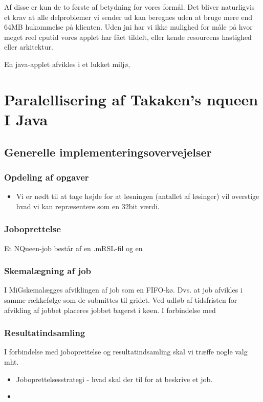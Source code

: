 \documentclass[final,a4paper,10pt]{article}
\newcommand{\mig}{MiG}
\begin{document}
Af disse er kun de to første af betydning for vores formål. Det bliver naturligvis et krav at alle delproblemer vi sender ud kan beregnes uden at bruge mere end 64MB hukommelse på klienten. Uden jni har vi ikke mulighed for måle på hvor meget reel cputid vores applet har fået tildelt, eller kende resourcens hastighed eller arkitektur. 

En java-applet afvikles i et lukket miljø, 


\section{Paralellisering af Takaken's nqueen I Java}

\subsection{Generelle implementeringsovervejelser}
\subsubsection{Opdeling af opgaver}

\begin{itemize}
\item{Vi er nødt til at tage højde for at løsningen (antallet af løsinger) vil overstige hvad vi kan repræsentere som en 32bit værdi. }
\end{itemize}

\subsubsection{Joboprettelse}
Et NQueen-job består af en .mRSL-fil og en  

\subsubsection{Skemalægning af job}
I \mig skemalægges afviklingen af job som en FIFO-kø. Dvs. at job afvikles i samme rækkefølge som de submittes til gridet. Ved udløb af tidsfristen for afvikling af jobbet placeres jobbet bagerst i køen. I forbindelse med 

\subsubsection{Resultatindsamling}
I forbindelse med joboprettelse og resultatindsamling skal vi træffe nogle valg mht. 
\begin{itemize}
\item{Joboprettelsesstrategi - hvad skal der til for at beskrive et job.}
\item{}
\end{itemize}
\end{document}
